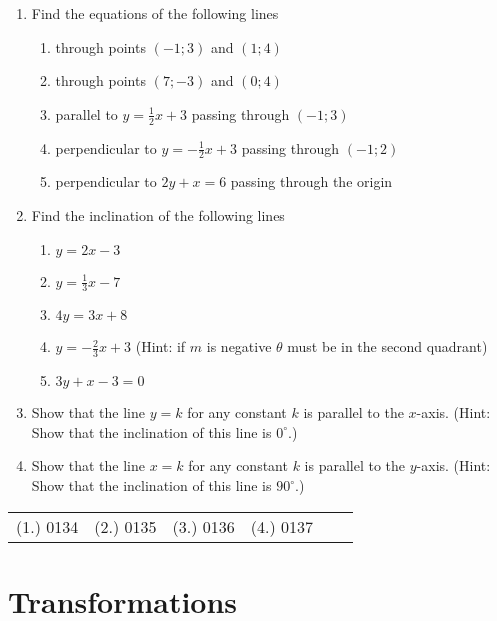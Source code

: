 {
\begin{enumerate}
\item Find the equations of the following lines
\begin{enumerate}
\item through points $(-1;3)$ and $(1;4)$
\item through points $(7;-3)$ and $(0;4)$
\item parallel to $y = \frac{1}{2}x + 3$ passing through $(-1;3)$
\item perpendicular to $y = -\frac{1}{2}x + 3$ passing through $(-1;2)$
\item perpendicular to $2y + x = 6$ passing through the origin
\end{enumerate}

\item Find the inclination of the following lines
\begin{enumerate}
\item $y = 2x -3$
\item $y = \frac{1}{3}x - 7$
\item $4y = 3x + 8$
\item $y = -\frac{2}{3}x + 3$  (Hint: if $m$ is negative $\theta$ must be in the second quadrant)
\item $3y + x - 3 = 0$
\end{enumerate}

\item{Show that the line $y=k$ for any constant $k$ is parallel to the $x$-axis. (Hint: Show that the inclination of this line is $0^{\circ}$.)}
\item{Show that the line $x=k$ for any constant $k$ is parallel to the $y$-axis. (Hint: Show that the inclination of this line is $90^{\circ}$.)}
\end{enumerate}


\par \practiceinfo
\par \begin{tabular}[h]{cccccc}
(1.)	0134	&
(2.)	0135	&
(3.)	0136	&
(4.)	0137	&
\end{tabular}}

\section{Transformations}
\label{mg:t}

